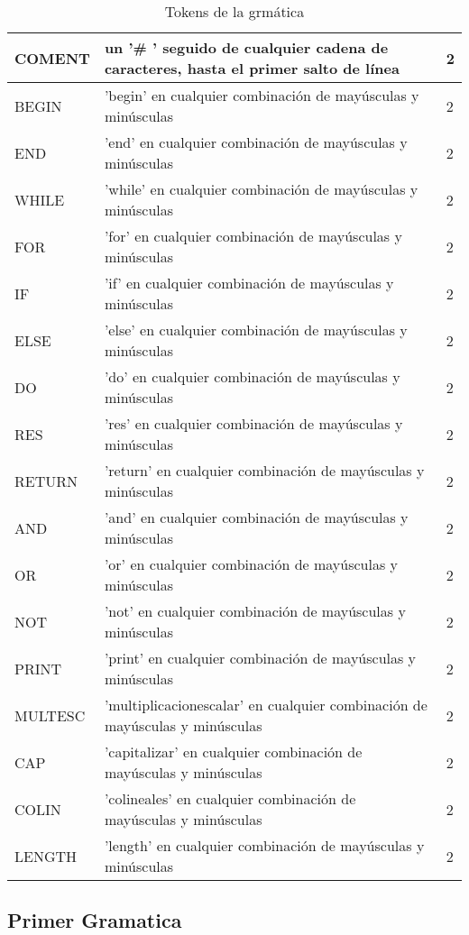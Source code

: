 \begin{table}[!htb]
\begin{center}
\begin{tabular}{| l | l | l |}
\hline
COMENT & un '\# ' seguido de cualquier cadena de caracteres, hasta el primer salto de línea & 2 \\
\hline
BEGIN & 'begin' en cualquier combinación de mayúsculas y minúsculas & 2 \\
\hline
END & 'end' en cualquier combinación de mayúsculas y minúsculas & 2 \\
\hline
WHILE & 'while' en cualquier combinación de mayúsculas y minúsculas & 2 \\
\hline
FOR & 'for' en cualquier combinación de mayúsculas y minúsculas & 2 \\
\hline
IF & 'if' en cualquier combinación de mayúsculas y minúsculas & 2 \\
\hline
ELSE & 'else' en cualquier combinación de mayúsculas y minúsculas & 2 \\
\hline
DO & 'do' en cualquier combinación de mayúsculas y minúsculas & 2 \\
\hline
RES & 'res' en cualquier combinación de mayúsculas y minúsculas & 2 \\
\hline
RETURN & 'return' en cualquier combinación de mayúsculas y minúsculas & 2 \\
\hline
AND & 'and' en cualquier combinación de mayúsculas y minúsculas & 2 \\
\hline
OR & 'or' en cualquier combinación de mayúsculas y minúsculas & 2 \\
\hline
NOT 	& 'not' en cualquier combinación de mayúsculas y minúsculas & 2 \\
\hline
PRINT & 'print' en cualquier combinación de mayúsculas y minúsculas & 2 \\
\hline
MULTESC & 'multiplicacionescalar' en cualquier combinación de mayúsculas y minúsculas & 2 \\
\hline
CAP & 'capitalizar' en cualquier combinación de mayúsculas y minúsculas & 2 \\
\hline
COLIN & 'colineales' en cualquier combinación de mayúsculas y minúsculas & 2 \\
\hline
LENGTH & 'length' en cualquier combinación de mayúsculas y minúsculas & 2 \\
\hline

\end{tabular}
\end{center}
\caption{Tokens de la grmática}\label{tab-tokens}
\end{table}



\subsection{Primer Gramatica}